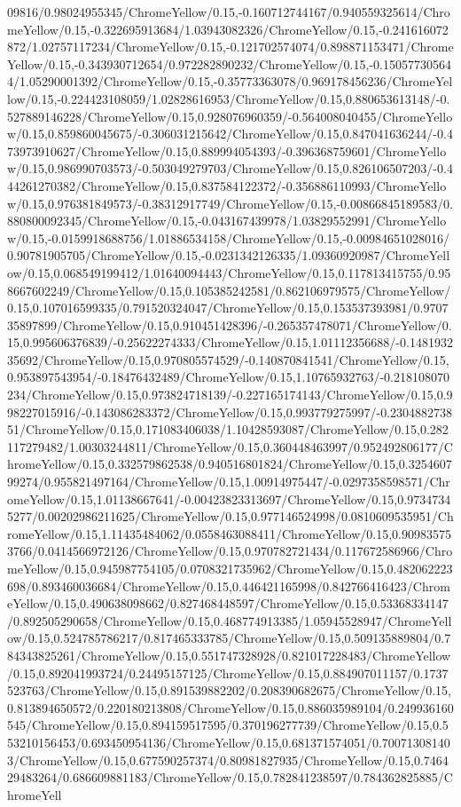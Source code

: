 {\begin{tikzternal}
{09816/0.98024955345/ChromeYellow/0.15,-0.160712744167/0.940559325614/ChromeYellow/0.15,-0.322695913684/1.03943082326/ChromeYellow/0.15,-0.241616072872/1.02757117234/ChromeYellow/0.15,-0.121702574074/0.898871153471/ChromeYellow/0.15,-0.343930712654/0.972282890232/ChromeYellow/0.15,-0.150577305644/1.05290001392/ChromeYellow/0.15,-0.35773363078/0.969178456236/ChromeYellow/0.15,-0.224423108059/1.02828616953/ChromeYellow/0.15,0.880653613148/-0.527889146228/ChromeYellow/0.15,0.928076960359/-0.564008040455/ChromeYellow/0.15,0.859860045675/-0.306031215642/ChromeYellow/0.15,0.847041636244/-0.473973910627/ChromeYellow/0.15,0.889994054393/-0.396368759601/ChromeYellow/0.15,0.986990703573/-0.503049279703/ChromeYellow/0.15,0.826106507203/-0.444261270382/ChromeYellow/0.15,0.837584122372/-0.356886110993/ChromeYellow/0.15,0.976381849573/-0.38312917749/ChromeYellow/0.15,-0.00866845189583/0.880800092345/ChromeYellow/0.15,-0.043167439978/1.03829552991/ChromeYellow/0.15,-0.0159918688756/1.01886534158/ChromeYellow/0.15,-0.00984651028016/0.90781905705/ChromeYellow/0.15,-0.0231342126335/1.09360920987/ChromeYellow/0.15,0.068549199412/1.01640094443/ChromeYellow/0.15,0.117813415755/0.958667602249/ChromeYellow/0.15,0.105385242581/0.862106979575/ChromeYellow/0.15,0.107016599335/0.791520324047/ChromeYellow/0.15,0.153537393981/0.970735897899/ChromeYellow/0.15,0.910451428396/-0.265357478071/ChromeYellow/0.15,0.995606376839/-0.25622274333/ChromeYellow/0.15,1.01112356688/-0.148193235692/ChromeYellow/0.15,0.970805574529/-0.140870841541/ChromeYellow/0.15,0.953897543954/-0.18476432489/ChromeYellow/0.15,1.10765932763/-0.218108070234/ChromeYellow/0.15,0.973824718139/-0.227165174143/ChromeYellow/0.15,0.998227015916/-0.143086283372/ChromeYellow/0.15,0.993779275997/-0.230488273851/ChromeYellow/0.15,0.171083406038/1.10428593087/ChromeYellow/0.15,0.282117279482/1.00303244811/ChromeYellow/0.15,0.360448463997/0.952492806177/ChromeYellow/0.15,0.332579862538/0.940516801824/ChromeYellow/0.15,0.325460799274/0.955821497164/ChromeYellow/0.15,1.00914975447/-0.0297358598571/ChromeYellow/0.15,1.01138667641/-0.00423823313697/ChromeYellow/0.15,0.97347345277/0.00202986211625/ChromeYellow/0.15,0.977146524998/0.0810609535951/ChromeYellow/0.15,1.11435484062/0.0558463088411/ChromeYellow/0.15,0.909835753766/0.0414566972126/ChromeYellow/0.15,0.970782721434/0.117672586966/ChromeYellow/0.15,0.945987754105/0.0708321735962/ChromeYellow/0.15,0.482062223698/0.893460036684/ChromeYellow/0.15,0.446421165998/0.842766416423/ChromeYellow/0.15,0.490638098662/0.827468448597/ChromeYellow/0.15,0.53368334147/0.892505290658/ChromeYellow/0.15,0.468774913385/1.05945528947/ChromeYellow/0.15,0.524785786217/0.817465333785/ChromeYellow/0.15,0.509135889804/0.784343825261/ChromeYellow/0.15,0.551747328928/0.821017228483/ChromeYellow/0.15,0.892041993724/0.24495157125/ChromeYellow/0.15,0.884907011157/0.1737523763/ChromeYellow/0.15,0.891539882202/0.208390682675/ChromeYellow/0.15,0.813894650572/0.220180213808/ChromeYellow/0.15,0.886035989104/0.249936160545/ChromeYellow/0.15,0.894159517595/0.370196277739/ChromeYellow/0.15,0.553210156453/0.693450954136/ChromeYellow/0.15,0.681371574051/0.700713081403/ChromeYellow/0.15,0.677590257374/0.80981827935/ChromeYellow/0.15,0.746429483264/0.686609881183/ChromeYellow/0.15,0.782841238597/0.784362825885/ChromeYell}
\end{tikzternal}}
